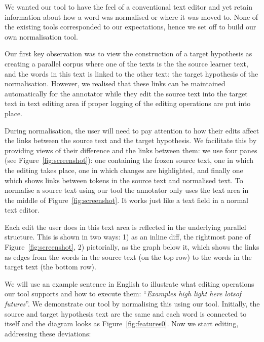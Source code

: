 \documentclass[10pt, a4paper]{article}
\begin{document}
We wanted our tool to have the feel of a conventional text editor and yet retain
information about how a word was normalised or where it was moved to. None of
the existing tools corresponded to our expectations, hence we set off to build
our own normalisation tool.

Our first key observation was to view the construction of a target hypothesis
as creating a parallel corpus where one of the texts is the the source learner
text, and the words in this text is linked to the other text: the target
hypothesis of the normalisation.
However, we realised that these links can be maintained automatically for
the annotator while they edit the source text into the target text in
text editing area if proper logging of the editing operations are put
into place.

During normalisation, the user will need to pay attention to how their edits affect
the links between the source text and the target hypothesis. We facilitate
this by providing views of their difference and the links between them:
we use four panes (see Figure~\ref{fig:screenshot}): one containing the
frozen source text, one in which the editing takes place, one in which
changes are highlighted, and finally one which shows links between tokens in the source text and normalised text.
To normalise a source text using our tool the annotator only uses
the text area in the middle of Figure~\ref{fig:screenshot}.
It works just like a text field in a normal text editor.

Each edit the user does in this text area is reflected in the underlying
parallel structure. This is shown in two ways:
1) as an inline diff, the rightmost pane of Figure~\ref{fig:screenshot},
2) pictorially, as the graph below it, which shows the links as edges from
the words in the source text (on the top row) to the words
in the target text (the bottom row).

We will use an example sentence in English to illustrate
what editing operations our tool supports and how to execute them:
``\emph{Examples high light here lotsof futures}''.
We demonstrate our tool by normalising this using our tool.
Initially, the source and target hypothesis text are
the same and each word is connected to itself and the diagram looks as
Figure~\ref{fig:features0}. Now we start editing, addressing these
deviations:
\end{document}
